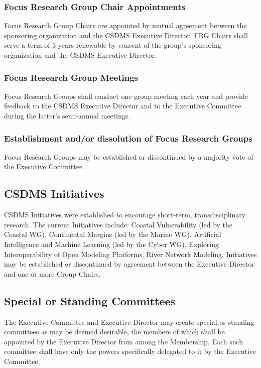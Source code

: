 \documentclass[11pt, oneside]{article}   	%
\begin{document}
\subsubsection{Focus Research Group Chair Appointments}
Focus Research Group Chairs are appointed by mutual agreement between the sponsoring organization and the CSDMS Executive Director. FRG Chairs shall serve a term of 3 years renewable by consent of the group's sponsoring organization and the CSDMS Executive Director.

\subsubsection{Focus Research Group Meetings}

Focus Research Groups shall conduct one group meeting each year and provide feedback to the CSDMS Executive Director and to the Executive Committee during the latter's semi-annual meetings.

\subsubsection{Establishment and/or dissolution of Focus Research Groups}

Focus Research Groups may be established or discontinued by a majority vote of the Executive Committee.  


\subsection{CSDMS Initiatives}

CSDMS Initiatives were established to encourage short-term, transdisciplinary research. The current Initiatives include: Coastal Vulnerability (led by the Coastal WG), Continental Margins (led by the Marine WG), Artificial Intelligence and Machine Learning (led by the Cyber WG), Exploring Interoperability of Open Modeling Platforms, River Network Modeling.  Initiatives may be established or discontinued by agreement between the Executive Director and one or more Group Chairs.


\subsection{Special or Standing Committees}

The Executive Committee and Executive Director may create special or standing committees as may be deemed desirable, the members of which shall be appointed by the Executive Director from among the Membership.  Each such committee shall have only the powers specifically delegated to it by the Executive Committee.
\end{document}
